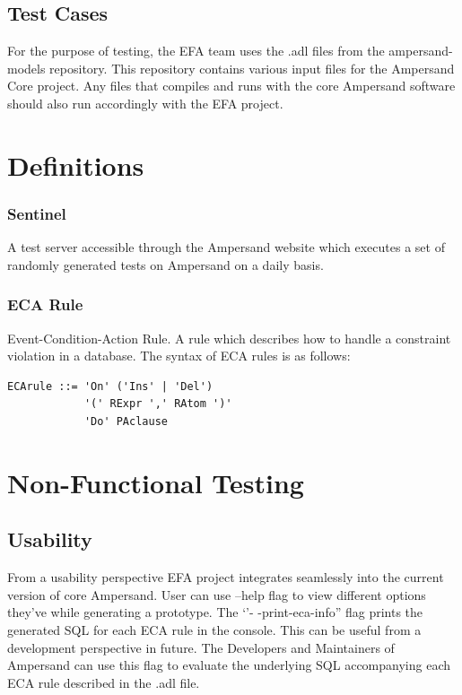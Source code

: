 \documentclass[12pt, svgnames]{article}
\begin{document}
\subsection{Test Cases}
For the purpose of testing, the EFA team uses the .adl files from the ampersand-models repository. This repository contains various input files for the Ampersand Core project. Any files that compiles and runs with the core Ampersand software should also run accordingly with the EFA project.

\section{Definitions}\label{sec:Abbrev}

 \subsubsection*{Sentinel}
A test server accessible through the Ampersand website which executes a set of 
randomly generated tests on Ampersand on a daily basis.

\subsubsection*{ECA Rule}
 Event-Condition-Action Rule. A rule which describes how to handle a constraint
 violation in a database. The syntax of ECA rules is as follows:
 

\begin{lstlisting}[basicstyle=\ttfamily]
ECArule ::= 'On' ('Ins' | 'Del') 
            '(' RExpr ',' RAtom ')'
            'Do' PAclause    
\end{lstlisting}

\section{Non-Functional Testing}

\subsection{Usability}
From a usability perspective EFA project integrates seamlessly into the current version of core Ampersand. User can use --help flag to view different options they've while generating a prototype. The `'- -print-eca-info'' flag prints the generated SQL for each ECA rule in the console. This can be useful from a development perspective in future. The Developers and Maintainers of Ampersand can use this flag to evaluate the underlying SQL accompanying each ECA rule described in the .adl file.
\end{document}
